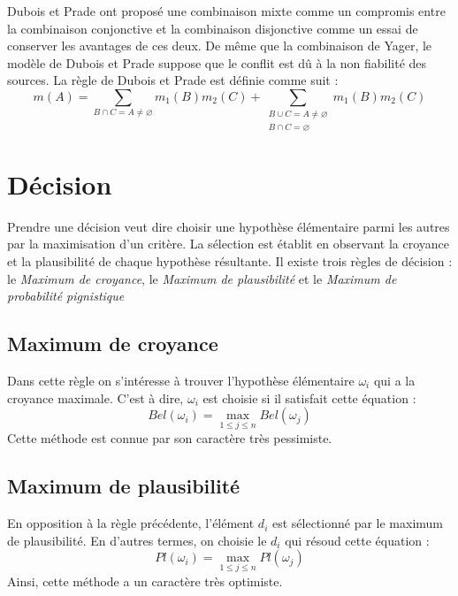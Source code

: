 Dubois et Prade ont proposé une combinaison mixte comme un compromis entre la
combinaison conjonctive et la combinaison disjonctive comme un essai de conserver
les avantages de ces deux. De même que la combinaison de  Yager, le modèle de Dubois
et Prade suppose que le conflit est dû à la non fiabilité des sources. La règle de
Dubois et Prade est définie comme suit :
\begin{equation}
m(A) = \sum_{B \cap C = A \neq \varnothing} m_1(B) m_2(C) +
\sum_{\substack{B \cup C = A \neq \varnothing \\ B \cap C = \varnothing}} m_1(B) m_2(C)
\end{equation}

\section{Décision}

Prendre une décision veut dire choisir une hypothèse élémentaire parmi les autres
par la maximisation d'un critère. La sélection est établit en observant
la croyance et la plausibilité de chaque hypothèse résultante. Il existe trois règles
de décision : le \emph{Maximum de croyance}, le \emph{Maximum de plausibilité} et le
\emph{Maximum de probabilité pignistique}

\subsection{Maximum de croyance}

Dans cette règle on s'intéresse à trouver l'hypothèse élémentaire $\omega_i$ qui
a la croyance maximale. C'est à dire, $\omega_i$ est choisie si il satisfait cette
équation :
\begin{equation}
Bel(\omega_i) = \max_{1 \leq j \leq n} Bel(\omega_j)
\end{equation}
Cette méthode est connue par son caractère très pessimiste.

\subsection{Maximum de plausibilité}

En opposition à la règle précédente, l'élément $d_i$ est sélectionné par le maximum
de plausibilité. En d'autres termes, on choisie le $d_i$ qui résoud cette équation :
\begin{equation}
Pl(\omega_i) = \max_{1 \leq j \leq n} Pl(\omega_j)
\end{equation}
Ainsi, cette méthode a un caractère très optimiste.

